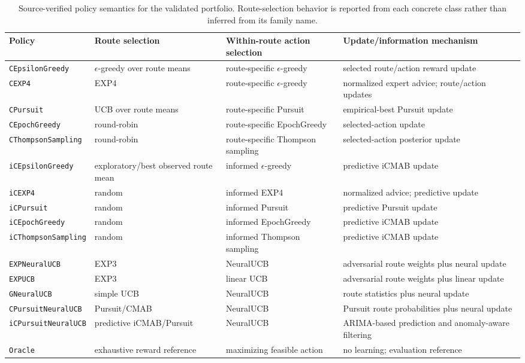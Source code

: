 \begin{table}[t]
\centering\scriptsize
\setlength{\tabcolsep}{2pt}
\caption{Source-verified policy semantics for the validated portfolio. Route-selection behavior is reported from each concrete class rather than inferred from its family name.}
\label{tab:policy_semantics}
\begin{tabular}{p{}p{}p{}p{}}
\toprule
\textbf{Policy} & \textbf{Route selection} & \textbf{Within-route action selection} & \textbf{Update/information mechanism}\\
\midrule
\texttt{CEpsilonGreedy} & $\epsilon$-greedy over route means & route-specific $\epsilon$-greedy & selected route/action reward update\\
\texttt{CEXP4} & EXP4 & route-specific $\epsilon$-greedy & normalized expert advice; route/action updates\\
\texttt{CPursuit} & UCB over route means & route-specific Pursuit & empirical-best Pursuit update\\
\texttt{CEpochGreedy} & round-robin & route-specific EpochGreedy & selected-action update\\
\texttt{CThompsonSampling} & round-robin & route-specific Thompson sampling & selected-action posterior update\\
\texttt{iCEpsilonGreedy} & exploratory/best observed route mean & informed $\epsilon$-greedy & predictive iCMAB update\\
\texttt{iCEXP4} & random & informed EXP4 & normalized advice; predictive update\\
\texttt{iCPursuit} & random & informed Pursuit & predictive Pursuit update\\
\texttt{iCEpochGreedy} & random & informed EpochGreedy & predictive iCMAB update\\
\texttt{iCThompsonSampling} & random & informed Thompson sampling & predictive iCMAB update\\
\texttt{EXPNeuralUCB} & EXP3 & NeuralUCB & adversarial route weights plus neural update\\
\texttt{EXPUCB} & EXP3 & linear UCB & adversarial route weights plus linear update\\
\texttt{GNeuralUCB} & simple UCB & NeuralUCB & route statistics plus neural update\\
\texttt{CPursuitNeuralUCB} & Pursuit/CMAB & NeuralUCB & Pursuit route probabilities plus neural update\\
\texttt{iCPursuitNeuralUCB} & predictive iCMAB/Pursuit & NeuralUCB & ARIMA-based prediction and anomaly-aware filtering\\
\texttt{Oracle} & exhaustive reward reference & maximizing feasible action & no learning; evaluation reference\\
\bottomrule
\end{tabular}
\end{table}

